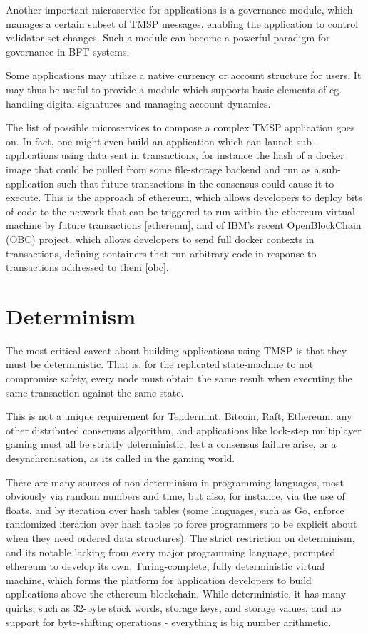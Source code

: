 Another important microservice for applications is a governance module, 
which manages a certain subset of TMSP messages, enabling the application to control validator set changes.
Such a module can become a powerful paradigm for governance in BFT systems.

Some applications may utilize a native currency or account structure for users.
It may thus be useful to provide a module which supports basic elements of eg. handling digital signatures and managing account dynamics.

The list of possible microservices to compose a complex TMSP application goes on. 
In fact, one might even build an application which can launch sub-applications using data sent in transactions,
for instance the hash of a docker image that could be pulled from some file-storage backend and run as a sub-application such that 
future transactions in the consensus could cause it to execute. 
This is the approach of ethereum, 
which allows developers to deploy bits of code to the network that can be triggered to run within the ethereum virtual machine by future transactions \ref{ethereum},
and of IBM's recent OpenBlockChain (OBC) project, which allows developers to send full docker contexts in transactions, 
defining containers that run arbitrary code in response to transactions addressed to them \ref{obc}.

\section{Determinism}

The most critical caveat about building applications using TMSP is that they must be deterministic.
That is, for the replicated state-machine to not compromise safety, 
every node must obtain the same result when executing the same transaction against the same state.

This is not a unique requirement for Tendermint. Bitcoin, Raft, Ethereum, any other distributed consensus algorithm,
and applications like lock-step multiplayer gaming must all be strictly deterministic, lest a consensus failure arise,
or a desynchronisation, as its called in the gaming world.

There are many sources of non-determinism in programming languages, most obviously via random numbers and time,
but also, for instance, via the use of floats, and by iteration over hash tables 
(some languages, such as Go, enforce randomized iteration over hash tables to force programmers to be explicit about when they need ordered data structures).
The strict restriction on determinism, and its notable lacking from every major programming language,
prompted ethereum to develop its own, Turing-complete, fully deterministic virtual machine,
which forms the platform for application developers to build applications above the ethereum blockchain.
While deterministic, it has many quirks, such as 32-byte stack words, storage keys, and storage values,
and no support for byte-shifting operations - everything is big number arithmetic.

